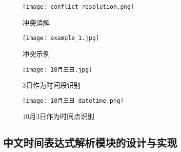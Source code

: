 \begin{figure}[h]
    \centering
    \texttt{[image: conflict resolution.png]}
    \caption{冲突消解}
    \label{fig:badge}
\end{figure}

\begin{figure}[h]
    \centering
    \texttt{[image: example\_1.jpg]}
    \caption{冲突示例}
    \label{fig:badge}
\end{figure}



\begin{figure}[h]
    \centering
    \texttt{[image: 10月三日.jpg]}
    \caption{3日作为时间段识别}
    \label{fig:badge}
\end{figure}


\begin{figure}[h]
    \centering
    \texttt{[image: 10月三日\_datetime.png]}
    \caption{10月3日作为时间点识别}
    \label{fig:badge}
\end{figure}


\subsection{中文时间表达式解析模块的设计与实现}

